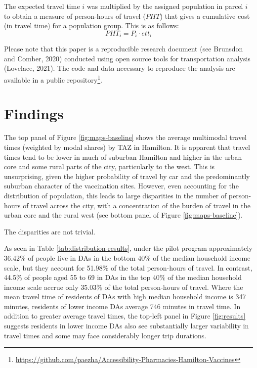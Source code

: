 \documentclass[]{elsarticle} %
\begin{document}
The expected travel time \(i\) was multiplied by the assigned population
in parcel \(i\) to obtain a measure of person-hours of travel (\(PHT\))
that gives a cumulative cost (in travel time) for a population group.
This is as follows: \[
PHT_i = P_i\cdot ett_i
\]

Please note that this paper is a reproducible research document (see
Brunsdon and Comber, 2020) conducted using open source tools for
transportation analysis (Lovelace, 2021). The code and data necessary to
reproduce the analysis are available in a public
repository\footnote{\url{https://github.com/paezha/Accessibility-Pharmacies-Hamilton-Vaccines}}.

\hypertarget{findings}{%
\section{Findings}\label{findings}}

The top panel of Figure \ref{fig:maps-baseline} shows the average
multimodal travel times (weighted by modal shares) by TAZ in Hamilton.
It is apparent that travel times tend to be lower in much of suburban
Hamilton and higher in the urban core and some rural parts of the city,
particularly to the west. This is unsurprising, given the higher
probability of travel by car and the predominantly suburban character of
the vaccination sites. However, even accounting for the distribution of
population, this leads to large disparities in the number of
person-hours of travel across the city, with a concentration of the
burden of travel in the urban core and the rural west (see bottom panel
of Figure \ref{fig:maps-baseline}).

The disparities are not trivial.

As seen in Table \ref{tab:distribution-results}, under the pilot program
approximately 36.42\% of people live in DAs in the bottom 40\% of the
median household income scale, but they account for 51.98\% of the total
person-hours of travel. In contrast, 44.5\% of people aged 55 to 69 in
DAs in the top 40\% of the median household income scale accrue only
35.03\% of the total person-hours of travel. Where the mean travel time
of residents of DAs with high median household income is 347 minutes,
residents of lower income DAs average 746 minutes in travel time. In
addition to greater average travel times, the top-left panel in Figure
\ref{fig:results} suggests residents in lower income DAs also see
substantially larger variability in travel times and some may face
considerably longer trip durations.
\end{document}
